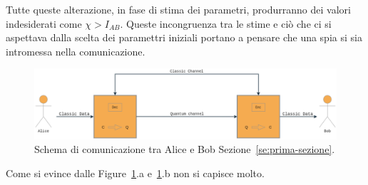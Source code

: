 Tutte queste alterazione, in fase di stima dei parametri, produrranno dei valori indesiderati come $\chi > I_{AB}$. Queste incongruenza tra le stime e ci\`o che ci si aspettava dalla scelta dei paramettri iniziali portano a pensare che una spia si sia intromessa nella comunicazione. 


\begin{figure}[h] 
\begin{center}
\includegraphics[width=\textwidth]{figure/alice_bob_communication.eps} 
\end{center}
\caption{Schema di comunicazione tra Alice e Bob Sezione~\ref{se:prima-sezione}.} \label{fig:figura-doppia}
\end{figure}

Come si evince dalle Figure~\ref{fig:figura-doppia}.a e~\ref{fig:figura-doppia}.b non si capisce molto.
